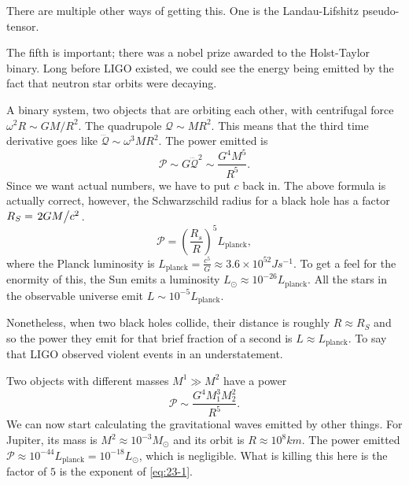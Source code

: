 \begin{remark}
  There are multiple other ways of getting this. One is the Landau-Lifshitz pseudo-tensor.
\end{remark}

\begin{remark}
  The fifth is important; there was a nobel prize awarded to the Holst-Taylor binary.
  Long before LIGO existed, we could see the energy being emitted by the fact that neutron star orbits were decaying.
\end{remark}

\begin{example}[]
  A binary system, two objects that are orbiting each other, with centrifugal force $\omega^2 R \sim GM / R^2$.
  The quadrupole $\mathcal{Q} \sim M R^2$. This means that the third time derivative goes like $\dddot{\mathcal{Q}} \sim \omega^3 M R^2$. The power emitted is
  \begin{equation}
    \mathcal{P} \sim G \dddot{\mathcal{Q}}^2 \sim \frac{G^4M^5}{R^5}.
  \end{equation}
  Since we want actual numbers, we have to put $c$ back in. The above formula is actually correct, however, the Schwarzschild radius for a black hole has a factor $R_S = \flatfrac{2GM}{c^2}$. 
  \begin{equation}
    \label{eq:23-1}
    \mathcal{P} = \left(\frac{R_s}{R}\right)^5 L_{\text{planck}},
  \end{equation}
  where the Planck luminosity is $L_{\text{planck}} = \frac{c^5}{G} \approx 3.6 \times 10^{52} Js^{-1}$.
 To get a feel for the enormity of this, the Sun emits a luminosity $L_\odot \approx 10^{-26} L_{\text{planck}}$.
 All the stars in the observable universe emit $L \sim 10^{-5} L_{\text{planck}}$.

  Nonetheless, when two black holes collide, their distance is roughly $R \approx R_S$ and so the power they emit for that brief fraction of a second is $L \approx L_{\text{planck}}$. To say that LIGO observed violent events in an understatement.
\end{example}

\begin{example}[]
  Two objects with different masses $M^1 \gg M^2$ have a power
  \begin{equation}
    \mathcal{P} \sim \frac{G^4 M_1^3 M_2^2}{R^5}.
  \end{equation}
  We can now start calculating the gravitational waves emitted by other things.
  For Jupiter, its mass is $M^2 \approx 10^{-3} M_\odot$ and its orbit is $R\approx 10^8 km$.
  The power emitted $\mathcal{P} \approx 10^{-44} L_{\text{planck}} = 10^{-18} L_\odot$, which is negligible. What is killing this here is the factor of $5$ is the exponent of \eqref{eq:23-1}.
\end{example}

